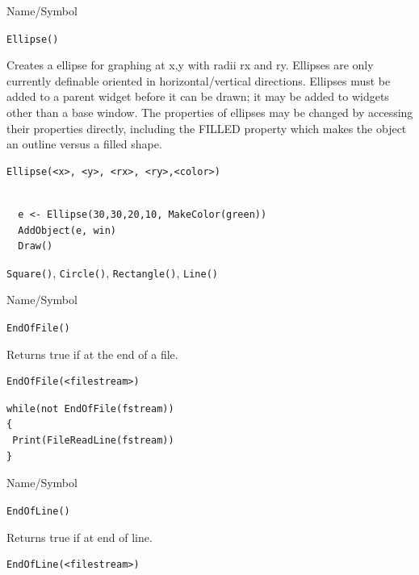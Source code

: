 \begin{desc}{Name/Symbol}
\item[Name/Symbol]	\verb+Ellipse()+
  
\item[Description]	Creates a ellipse for graphing at x,y with radii
  rx and ry. Ellipses are only currently definable oriented in
  horizontal/vertical directions.  Ellipses  must be added
  to a parent widget before it can be drawn; it may be added to
  widgets other than a base window.  The properties of ellipses may be
  changed by accessing their properties directly, including the FILLED
  property which makes the object an outline versus a filled shape.

\item[Usage]
\begin{verbatim}
Ellipse(<x>, <y>, <rx>, <ry>,<color>)
\end{verbatim}

\item[Example]	
\begin{verbatim}
  
  e <- Ellipse(30,30,20,10, MakeColor(green))
  AddObject(e, win)
  Draw()

\end{verbatim}
\item[See Also]	\verb+Square()+, \verb+Circle()+, \verb+Rectangle()+, \verb+Line()+
\end{desc}


\begin{desc}{Name/Symbol}
\item[Name/Symbol]	\verb+EndOfFile()+

\item[Description]	Returns true if at the end of a file.

\item[Usage]
\begin{verbatim}
EndOfFile(<filestream>)
\end{verbatim}

\item[Example]
\begin{verbatim}
while(not EndOfFile(fstream))
{
 Print(FileReadLine(fstream))
}
\end{verbatim}

\item[See Also]	
\end{desc}


\begin{desc}{Name/Symbol}
\item[Name/Symbol]	\verb+EndOfLine()+

\item[Description]	Returns true if at end of line.

\item[Usage]
\begin{verbatim}
EndOfLine(<filestream>)
\end{verbatim}

\item[Example]	

\item[See Also]	
\end{desc}

